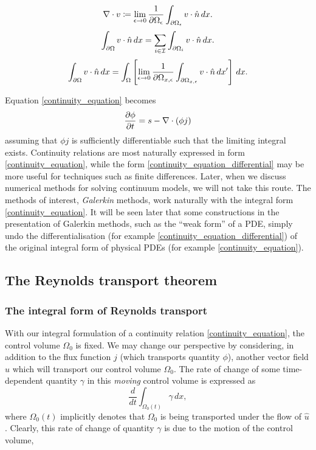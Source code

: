 \begin{equation}
    \nabla\cdot v \coloneqq \lim_{\epsilon \rightarrow 0} \frac{1}{{\partial\Omega}_\epsilon}\int_{{\partial\Omega}_\epsilon}v\cdot\hat{n}\,dx.
\end{equation}
\begin{equation}
    \int_{{\partial\Omega}}v\cdot \hat{n}\,dx = \sum_{i\in\mathcal{I}}\int_{{\partial\Omega}_i}v\cdot \hat{n}\,dx.
\end{equation}
\begin{equation}
    \int_{{\partial\Omega}}v\cdot \hat{n}\,dx = \int_{\Omega} \left[\lim_{\epsilon \rightarrow 0}\frac{1}{{\partial\Omega}_{x,\epsilon}}\int_{{\partial\Omega}_{x,\epsilon}}v\cdot\hat{n}\,dx^\prime\right]\,dx.
\end{equation}


Equation \eqref{continuity_equation} becomes
\begin{equation}\label{continuity_equation_differential}
    \frac{\partial \phi}{\partial t} = s - \nabla\cdot (\phi j)
\end{equation}
assuming that $\phi j$ is sufficiently differentiable such that the limiting integral exists.
Continuity relations are most naturally expressed in form \eqref{continuity_equation}, while the form
\eqref{continuity_equation_differential} may be more useful for techniques such as finite differences.
Later, when we discuss numerical methods for solving continuum models, we will not take this route. The methods of interest, \textit{Galerkin} methods,
work naturally with the integral form \eqref{continuity_equation}.
It will be seen later that some constructions in the presentation of Galerkin methods, such as the ``weak form'' of a PDE, simply undo the differentialisation
(for example \eqref{continuity_equation_differential}) of the original integral form of physical PDEs (for example \eqref{continuity_equation}).
\subsection{The Reynolds transport theorem}
\subsubsection{The integral form of Reynolds transport}
With our integral formulation of a continuity relation \eqref{continuity_equation}, the control volume $\Omega_0$ is fixed.
We may change our perspective by considering, in addition to the flux function $j$ (which transports quantity $\phi$), another
vector field $\hat{u}$ which will transport our control volume $\Omega_0$. The rate of change of some time-dependent quantity $\gamma$ in this
\textit{moving} control volume is expressed as
\begin{equation}\label{reynolds_rate_of_change}
    \frac{d}{dt}\int_{\Omega_0(t)}\gamma\,dx,
\end{equation}
where $\Omega_0(t)$ implicitly denotes that $\Omega_0$ is being transported under the flow of $\hat{u}$.
Clearly, this rate of change of quantity $\gamma$ is due to the motion of the control volume,

